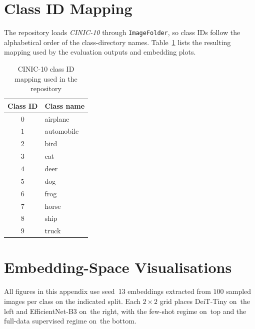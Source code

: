 \documentclass[12pt,a4paper]{article}
\begin{document}
\appendix

\section{Class ID Mapping}
\label{sec:appendix-class-ids}

The repository loads \emph{CINIC-10} through \texttt{ImageFolder}, so class IDs follow the alphabetical order of the class-directory names. Table~\ref{tab:class-id-mapping} lists the resulting mapping used by the evaluation outputs and embedding plots.

\begin{table}[h!]
\centering
\caption{CINIC-10 class ID mapping used in the repository}
\label{tab:class-id-mapping}
\smallskip
\small
\begin{tabular}{@{}cl@{}}
\toprule
\textbf{Class ID} & \textbf{Class name} \\
\midrule
$0$ & airplane \\
$1$ & automobile \\
$2$ & bird \\
$3$ & cat \\
$4$ & deer \\
$5$ & dog \\
$6$ & frog \\
$7$ & horse \\
$8$ & ship \\
$9$ & truck \\
\bottomrule
\end{tabular}
\end{table}

\section{Embedding-Space Visualisations}
\label{sec:appendix-plots}

All figures in this appendix use seed~13 embeddings extracted from $100$ sampled images per class on the indicated split. Each $2 \times 2$ grid places DeiT-Tiny on~the left and EfficientNet-B3 on~the right, with the few-shot regime on~top and the full-data supervised regime on~the bottom.
\end{document}
